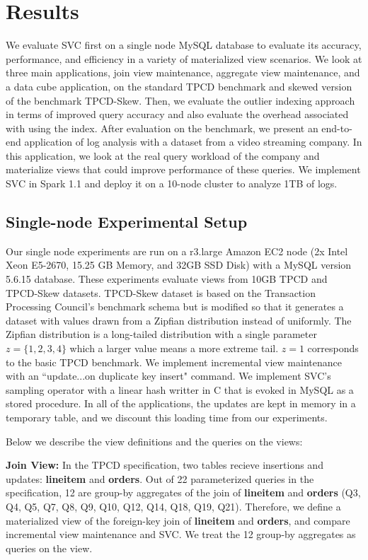 \vspace{-.5em}
\section{Results}
\label{exp}
We evaluate SVC first on a single node MySQL database to evaluate its accuracy, performance, and efficiency in a variety of materialized view 
scenarios.
We look at three main applications, join view maintenance, aggregate view maintenance, and a data cube application, on the standard TPCD benchmark 
and skewed version of the benchmark TPCD-Skew.
Then, we evaluate the outlier indexing approach in terms of improved query accuracy and also evaluate the overhead associated with using the index.
After evaluation on the benchmark, we present an end-to-end application of log analysis with a dataset from a video streaming company.
In this application, we look at the real query workload of the company and materialize views that could improve performance of these queries.
We implement SVC in Spark 1.1 and deploy it on a 10-node cluster to analyze 1TB of logs.

\subsection{Single-node Experimental Setup}
Our single node experiments are run on a r3.large Amazon EC2 node (2x Intel Xeon E5-2670, 15.25 GB Memory, and 32GB SSD Disk) with a MySQL version 5.6.15 database.
These experiments evaluate views from 10GB TPCD and TPCD-Skew datasets.
TPCD-Skew dataset \cite{tpcdskew} is based on the Transaction Processing Council's benchmark
schema but is modified so that it generates a dataset with values drawn from a Zipfian distribution instead of uniformly.
The Zipfian distribution \cite{mitzenmacher2004brief} is a long-tailed distribution with a single parameter $z=\{1,2,3,4\}$ which a larger
value means a more extreme tail.
$z=1$ corresponds to the basic TPCD benchmark. 
We implement incremental view maintenance with an ``update...on duplicate key insert" command.
We implement SVC's sampling operator with a linear hash writter in C that is evoked in MySQL as a stored procedure.
In all of the applications, the updates are kept in memory in a temporary table, and we discount this loading time from our experiments.

Below we describe the view definitions and the queries on the views:

\textbf{Join View: } In the TPCD specification, two tables recieve insertions and updates: \textbf{lineitem} and \textbf{orders}.
Out of 22 parameterized queries in the specification, 12 are group-by aggregates of the join of \textbf{lineitem} and \textbf{orders} (Q3, Q4, Q5, Q7, Q8, Q9, Q10, Q12, Q14, Q18, Q19, Q21).
Therefore, we define a materialized view of the foreign-key join of \textbf{lineitem} and \textbf{orders}, and compare incremental view maintenance and SVC.
We treat the 12 group-by aggregates as queries on the view.

